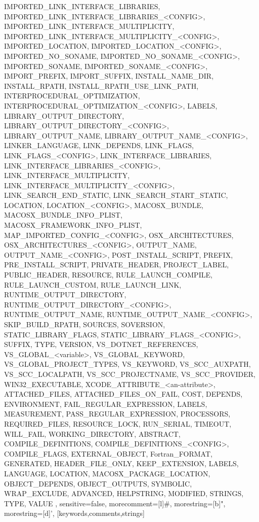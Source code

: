 {{IMPORTED_LINK_INTERFACE_LIBRARIES,
IMPORTED_LINK_INTERFACE_LIBRARIES_<CONFIG>,
IMPORTED_LINK_INTERFACE_MULTIPLICITY,
IMPORTED_LINK_INTERFACE_MULTIPLICITY_<CONFIG>,
IMPORTED_LOCATION,
IMPORTED_LOCATION_<CONFIG>,
IMPORTED_NO_SONAME,
IMPORTED_NO_SONAME_<CONFIG>,
IMPORTED_SONAME,
IMPORTED_SONAME_<CONFIG>,
IMPORT_PREFIX,
IMPORT_SUFFIX,
INSTALL_NAME_DIR,
INSTALL_RPATH,
INSTALL_RPATH_USE_LINK_PATH,
INTERPROCEDURAL_OPTIMIZATION,
INTERPROCEDURAL_OPTIMIZATION_<CONFIG>,
LABELS,
LIBRARY_OUTPUT_DIRECTORY,
LIBRARY_OUTPUT_DIRECTORY_<CONFIG>,
LIBRARY_OUTPUT_NAME,
LIBRARY_OUTPUT_NAME_<CONFIG>,
LINKER_LANGUAGE,
LINK_DEPENDS,
LINK_FLAGS,
LINK_FLAGS_<CONFIG>,
LINK_INTERFACE_LIBRARIES,
LINK_INTERFACE_LIBRARIES_<CONFIG>,
LINK_INTERFACE_MULTIPLICITY,
LINK_INTERFACE_MULTIPLICITY_<CONFIG>,
LINK_SEARCH_END_STATIC,
LINK_SEARCH_START_STATIC,
LOCATION,
LOCATION_<CONFIG>,
MACOSX_BUNDLE,
MACOSX_BUNDLE_INFO_PLIST,
MACOSX_FRAMEWORK_INFO_PLIST,
MAP_IMPORTED_CONFIG_<CONFIG>,
OSX_ARCHITECTURES,
OSX_ARCHITECTURES_<CONFIG>,
OUTPUT_NAME,
OUTPUT_NAME_<CONFIG>,
POST_INSTALL_SCRIPT,
PREFIX,
PRE_INSTALL_SCRIPT,
PRIVATE_HEADER,
PROJECT_LABEL,
PUBLIC_HEADER,
RESOURCE,
RULE_LAUNCH_COMPILE,
RULE_LAUNCH_CUSTOM,
RULE_LAUNCH_LINK,
RUNTIME_OUTPUT_DIRECTORY,
RUNTIME_OUTPUT_DIRECTORY_<CONFIG>,
RUNTIME_OUTPUT_NAME,
RUNTIME_OUTPUT_NAME_<CONFIG>,
SKIP_BUILD_RPATH,
SOURCES,
SOVERSION,
STATIC_LIBRARY_FLAGS,
STATIC_LIBRARY_FLAGS_<CONFIG>,
SUFFIX,
TYPE,
VERSION,
VS_DOTNET_REFERENCES,
VS_GLOBAL_<variable>,
VS_GLOBAL_KEYWORD,
VS_GLOBAL_PROJECT_TYPES,
VS_KEYWORD,
VS_SCC_AUXPATH,
VS_SCC_LOCALPATH,
VS_SCC_PROJECTNAME,
VS_SCC_PROVIDER,
WIN32_EXECUTABLE,
XCODE_ATTRIBUTE_<an-attribute>,
ATTACHED_FILES,
ATTACHED_FILES_ON_FAIL,
COST,
DEPENDS,
ENVIRONMENT,
FAIL_REGULAR_EXPRESSION,
LABELS,
MEASUREMENT,
PASS_REGULAR_EXPRESSION,
PROCESSORS,
REQUIRED_FILES,
RESOURCE_LOCK,
RUN_SERIAL,
TIMEOUT,
WILL_FAIL,
WORKING_DIRECTORY,
ABSTRACT,
COMPILE_DEFINITIONS,
COMPILE_DEFINITIONS_<CONFIG>,
COMPILE_FLAGS,
EXTERNAL_OBJECT,
Fortran_FORMAT,
GENERATED,
HEADER_FILE_ONLY,
KEEP_EXTENSION,
LABELS,
LANGUAGE,
LOCATION,
MACOSX_PACKAGE_LOCATION,
OBJECT_DEPENDS,
OBJECT_OUTPUTS,
SYMBOLIC,
WRAP_EXCLUDE,
ADVANCED,
HELPSTRING,
MODIFIED,
STRINGS,
TYPE,
VALUE
         },
	 sensitive=false,
	 morecomment=[l]{\#},
	 morestring=[b]",
	 morestring=[d]',
	}[keywords,comments,strings]
